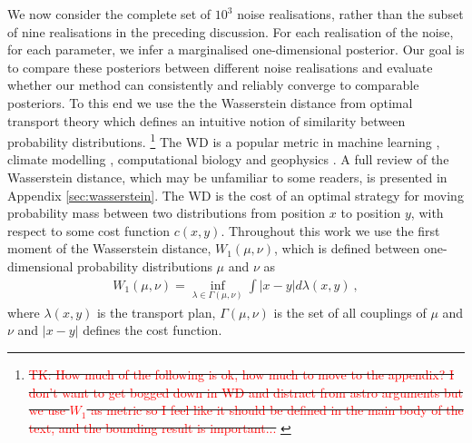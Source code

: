 \documentclass[fleqn,usenatbib,useAMS]{mnras}
\providecommand{\DIFadd}[1]{{\protect\color{blue}\uwave{#1}}} %
\providecommand{\DIFdel}[1]{{\protect\color{red}\sout{#1}}}                      %
\providecommand{\DIFaddbegin}{} %
\providecommand{\DIFaddend}{} %
\providecommand{\DIFdelbegin}{} %
\providecommand{\DIFdelend}{} %
\newcommand{\DIFscaledelfig}{0.5}
\newlength{\DIFdelgraphicswidth} %
\newlength{\DIFdelgraphicsheight} %
\newcommand{\DIFaddincludegraphics}[2][]{{\color{blue}\fbox{\DIFOincludegraphics[#1]{#2}}}} %
\newcommand{\DIFdelincludegraphics}[2][]{%
\sbox{\DIFdelgraphicsbox}{\DIFOincludegraphics[#1]{#2}}%
\settoboxwidth{\DIFdelgraphicswidth}{\DIFdelgraphicsbox} %
\settoboxtotalheight{\DIFdelgraphicsheight}{\DIFdelgraphicsbox} %
\scalebox{\DIFscaledelfig}{%
\parbox[b]{\DIFdelgraphicswidth}{\usebox{\DIFdelgraphicsbox}\\[-\baselineskip] \rule{\DIFdelgraphicswidth}{0em}}\llap{\resizebox{\DIFdelgraphicswidth}{\DIFdelgraphicsheight}{%
\setlength{\unitlength}{\DIFdelgraphicswidth}%
\begin{picture}(1,1)%
\thicklines\linethickness{2pt} %
{\color[rgb]{1,0,0}\put(0,0){\framebox(1,1){}}}%
{\color[rgb]{1,0,0}\put(0,0){\line( 1,1){1}}}%
{\color[rgb]{1,0,0}\put(0,1){\line(1,-1){1}}}%
\end{picture}%
}\hspace*{3pt}}} %
} %
\DeclareRobustCommand{\DIFaddbegin}{\DIFOaddbegin \let\includegraphics\DIFaddincludegraphics} %
\DeclareRobustCommand{\DIFaddend}{\DIFOaddend \let\includegraphics\DIFOincludegraphics} %
\DeclareRobustCommand{\DIFdelbegin}{\DIFOdelbegin \let\includegraphics\DIFdelincludegraphics} %
\DeclareRobustCommand{\DIFdelend}{\DIFOaddend \let\includegraphics\DIFOincludegraphics} %
\begin{document}
We now consider the complete set of $10^3$ noise realisations, rather than the subset of nine realisations in the preceding discussion. For each realisation of the noise, for each parameter, we infer a marginalised one-dimensional posterior. Our goal is to compare these posteriors between different noise realisations and evaluate whether our method can consistently and reliably converge to comparable posteriors. To this end we use the the Wasserstein distance \citep[WD;][]{Wasserstein,Villani2009} from optimal transport theory which defines an intuitive notion of similarity between probability distributions. \footnote{\DIFdelbegin \DIFdel{\textcolor{red}{\tiny TK: How much of the following is ok, how much to move to the appendix? I don't want to get bogged down in WD and distract from astro arguments but we use $W_1$ as metric so I feel like it should be defined in the main body of the text, and the bounding result is important...} }\DIFdelend \DIFaddbegin \DIFadd{\textcolor{red}{\tiny TK: How much of the following Wasserstein stuff is ok here, how much to move to the appendix? I don't want to get bogged down in WD and distract from astro arguments, but we use $W_1$ as metric so I feel like it should be defined in the main body of the text, and the bounding result is important...} }\DIFaddend \normalsize} The WD is a popular metric in machine learning \citep{2017arXiv170107875A}, climate modelling \citep{2022JCli...35.1215P,2023QJRMS.149..843K}, computational biology \citep{GONZALEZDELGADO2023168053} and geophysics \citep{2023GeoRL..5003880M}. A full review of the Wasserstein distance, which may be unfamiliar to some readers, is presented in Appendix \ref{sec:wasserstein}. The WD is the cost of an optimal strategy for moving probability mass between two distributions from position $x$ to position $y$, with respect to some cost function $c(x,y)$. Throughout this work we use the first moment of the Wasserstein distance, $W_1(\mu,\nu)$, which is defined between one-dimensional probability distributions $\mu$ and $\nu$ as
\begin{eqnarray}
	W_1(\mu,\nu)=  \inf_{\lambda \in \Gamma(\mu, \nu)} \int |x-y| d \lambda (x,y) \ ,
\end{eqnarray}
where $\lambda(x,y)$ is the transport plan, $\Gamma(\mu, \nu)$ is the set of all couplings of $\mu$ and $\nu$ and $ |x-y|$ defines the cost function. \DIFdelbegin %
\end{document}
